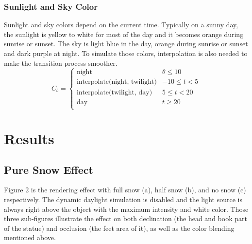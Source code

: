 \documentclass{article}
\begin{document}
\subsubsection {Sunlight and Sky Color}
Sunlight and sky colors depend on the current time. Typically on a sunny day, the sunlight is yellow to white for most of the day and 
it becomes orange during sunrise or sunset. The sky is light blue in the day, orange during sunrise or sunset and dark purple at night. 
To simulate those colors, interpolation is also needed to make the transition process smoother. 
\[
  C_{b}=
  \left\{
    \begin{array}{ll}
      \text{night} & \theta \leq 10 \\
      \text{interpolate(night, twilight)} &  -10 \leq t < 5 \\
      \text{interpolate(twilight, day)} &  5 \leq t < 20 \\
      \text{day} & t \geq 20 \\
    \end{array} 
  \right. 
\]

\section{Results}

\subsection {Pure Snow Effect}
Figure 2 is the rendering effect with full snow (a), half snow (b), and no snow (c) respectively. The dynamic daylight simulation is 
disabled and the light source is always right above the object with the maximum intensity and white color. Those three sub-figures 
illustrate the effect on both declination (the head and book part of the statue) and occlusion (the feet area of it), as well as the 
color blending mentioned above.
\end{document}
